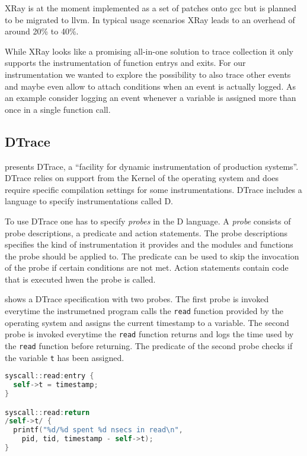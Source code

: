 XRay is at the moment implemented as a set of patches onto \gls{gcc} but is planned to be migrated to \gls{llvm}.
In typical usage scenarios XRay leads to an overhead of around 20\% to 40\%.

While XRay looks like a promising all-in-one solution to trace collection it only supports the instrumentation of function entrys and exits.
For our instrumentation we wanted to explore the possibility to also trace other events and maybe even allow to attach conditions when an event is actually logged.
As an example consider logging an event whenever a variable is assigned more than once in a single function call.

\subsection{DTrace}

\Cite{Cantrill2004} presents DTrace, a ``facility for dynamic instrumentation of production systems''.
DTrace relies on support from the Kernel of the operating system and does require specific compilation settings for some instrumentations.
DTrace includes a language to specify instrumentations called D.

To use DTrace one has to specify \emph{probes} in the D language.
A \emph{probe} consists of probe descriptions, a predicate and action statements.
The probe descriptions specifies the kind of instrumentation it provides and the modules and functions the probe should be applied to.
The predicate can be used to skip the invocation of the probe if certain conditions are not met.
Action statements contain code that is executed hwen the probe is called.

 shows a DTrace specification with two probes.
The first probe is invoked everytime the instrumetned program calls the \lstinline{read} function provided by the operating system and assigns the current timestamp to a variable.
The second probe is invoked everytime the \lstinline{read} function returns and logs the time used by the \lstinline{read} function before returning.
The predicate of the second probe checks if the variable \lstinline{t} has been assigned.

\begin{lstlisting}[showstringspaces=false,language=C,float,label=listing:dtrace_spec, caption={A DTrace specification in the D language specifying two probes}]
syscall::read:entry {
  self->t = timestamp;
}

syscall::read:return
/self->t/ {
  printf("%d/%d spent %d nsecs in read\n",
    pid, tid, timestamp - self->t);
}
\end{lstlisting}

